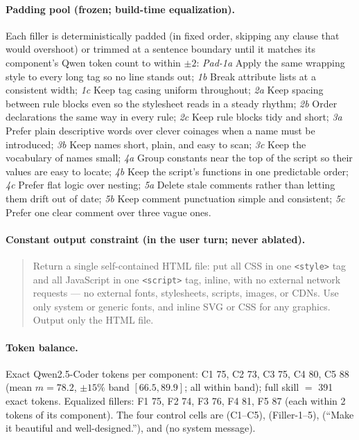 \paragraph{Padding pool (frozen; build-time equalization).} Each filler is deterministically padded (in
fixed order, skipping any clause that would overshoot) or trimmed at a sentence boundary until it matches
its component's Qwen token count to within $\pm2$: \emph{Pad-1a} Apply the same wrapping style to every
long tag so no line stands out; \emph{1b} Break attribute lists at a consistent width; \emph{1c} Keep
tag casing uniform throughout; \emph{2a} Keep spacing between rule blocks even so the stylesheet reads in
a steady rhythm; \emph{2b} Order declarations the same way in every rule; \emph{2c} Keep rule blocks tidy
and short; \emph{3a} Prefer plain descriptive words over clever coinages when a name must be introduced;
\emph{3b} Keep names short, plain, and easy to scan; \emph{3c} Keep the vocabulary of names small;
\emph{4a} Group constants near the top of the script so their values are easy to locate; \emph{4b} Keep
the script's functions in one predictable order; \emph{4c} Prefer flat logic over nesting; \emph{5a}
Delete stale comments rather than letting them drift out of date; \emph{5b} Keep comment punctuation
simple and consistent; \emph{5c} Prefer one clear comment over three vague ones.

\paragraph{Constant output constraint (in the user turn; never ablated).}
\begin{quote}\small
Return a single self-contained HTML file: put all CSS in one \texttt{<style>} tag and all JavaScript in
one \texttt{<script>} tag, inline, with no external network requests --- no external fonts, stylesheets,
scripts, images, or CDNs. Use only system or generic fonts, and inline SVG or CSS for any graphics.
Output only the HTML file.
\end{quote}

\paragraph{Token balance.} Exact Qwen2.5-Coder tokens per component: C1 75, C2 73, C3 75, C4 80, C5 88
(mean $m{=}78.2$, $\pm15\%$ band $[66.5,89.9]$; all within band); full skill $=$ 391 exact tokens.
Equalized fillers: F1 75, F2 74, F3 76, F4 81, F5 87 (each within 2 tokens of its component). The four
control cells are \FULL{} (C1--C5), \NEUTRAL{} (Filler-1--5), \BEAUTY{} (``Make it beautiful and
well-designed.''), and \NOSYS{} (no system message).

